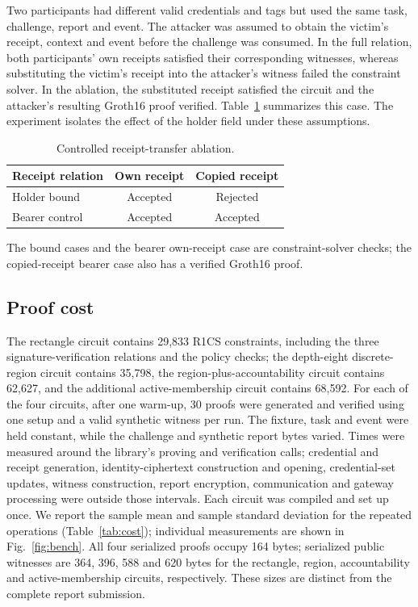 \documentclass[pdflatex,iicol,sn-mathphys-num]{sn-jnl}
\begin{document}
Two participants had different valid credentials and tags but used the same task, challenge, report and event. The attacker was assumed to obtain the victim's receipt, context and event before the challenge was consumed. In the full relation, both participants' own receipts satisfied their corresponding witnesses, whereas substituting the victim's receipt into the attacker's witness failed the constraint solver. In the ablation, the substituted receipt satisfied the circuit and the attacker's resulting Groth16 proof verified. Table~\ref{tab:ablation} summarizes this case. The experiment isolates the effect of the holder field under these assumptions.

\begin{table}[t]
\centering\caption{Controlled receipt-transfer ablation.}\label{tab:ablation}
\begin{tabular}{@{}lcc@{}}\toprule
Receipt relation & Own receipt & Copied receipt \\\midrule
Holder bound & Accepted & Rejected \\
Bearer control & Accepted & Accepted \\\bottomrule
\end{tabular}\par\vspace{2pt}
\footnotesize The bound cases and the bearer own-receipt case are constraint-solver checks; the copied-receipt bearer case also has a verified Groth16 proof.
\end{table}

\subsection{Proof cost}
The rectangle circuit contains 29,833 R1CS constraints, including the three signature-verification relations and the policy checks; the depth-eight discrete-region circuit contains 35,798, the region-plus-accountability circuit contains 62,627, and the additional active-membership circuit contains 68,592. For each of the four circuits, after one warm-up, 30 proofs were generated and verified using one setup and a valid synthetic witness per run. The fixture, task and event were held constant, while the challenge and synthetic report bytes varied. Times were measured around the library's proving and verification calls; credential and receipt generation, identity-ciphertext construction and opening, credential-set updates, witness construction, report encryption, communication and gateway processing were outside those intervals. Each circuit was compiled and set up once. We report the sample mean and sample standard deviation for the repeated operations (Table~\ref{tab:cost}); individual measurements are shown in Fig.~\ref{fig:bench}. All four serialized proofs occupy 164 bytes; serialized public witnesses are 364, 396, 588 and 620 bytes for the rectangle, region, accountability and active-membership circuits, respectively. These sizes are distinct from the complete report submission.
\end{document}
